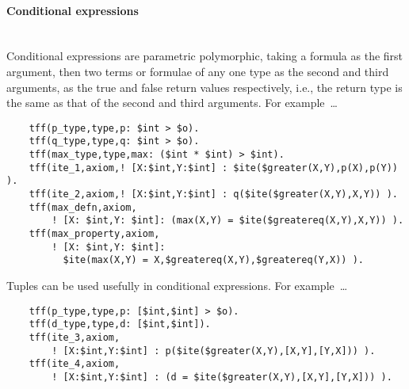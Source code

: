 \documentclass{easychair}
\begin{document}
\paragraph{Conditional expressions}~\\
Conditional expressions are parametric polymorphic, taking a formula as the 
first argument, then two terms or formulae of any one type as the second and 
third arguments, as the true and false return values respectively, i.e., the 
return type is the same as that of the second and third arguments. 
For example~\ldots
\begin{verbatim}
    tff(p_type,type,p: $int > $o).
    tff(q_type,type,q: $int > $o).
    tff(max_type,type,max: ($int * $int) > $int).
    tff(ite_1,axiom,! [X:$int,Y:$int] : $ite($greater(X,Y),p(X),p(Y)) ).
    tff(ite_2,axiom,! [X:$int,Y:$int] : q($ite($greater(X,Y),X,Y)) ).
    tff(max_defn,axiom,
        ! [X: $int,Y: $int]: (max(X,Y) = $ite($greatereq(X,Y),X,Y)) ).
    tff(max_property,axiom,
        ! [X: $int,Y: $int]: 
          $ite(max(X,Y) = X,$greatereq(X,Y),$greatereq(Y,X)) ).
\end{verbatim}
Tuples can be used usefully in conditional expressions. For example~\ldots
\begin{verbatim}
    tff(p_type,type,p: [$int,$int] > $o).
    tff(d_type,type,d: [$int,$int]).
    tff(ite_3,axiom,
        ! [X:$int,Y:$int] : p($ite($greater(X,Y),[X,Y],[Y,X])) ).
    tff(ite_4,axiom,
        ! [X:$int,Y:$int] : (d = $ite($greater(X,Y),[X,Y],[Y,X])) ).
\end{verbatim}
\end{document}
